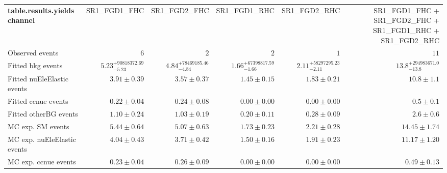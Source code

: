 

\begin{table}
\begin{center}
\setlength{\tabcolsep}{0.0pc}
{\small
\begin{tabular*}{\textwidth}{@{\extracolsep{\fill}}lrrrrr}
\noalign{\smallskip}\hline\noalign{\smallskip}
{\bf table.results.yields channel}           & SR1\_FGD1\_FHC            & SR1\_FGD2\_FHC            & SR1\_FGD1\_RHC            & SR1\_FGD2\_RHC            & SR1\_FGD1\_FHC + SR1\_FGD2\_FHC + SR1\_FGD1\_RHC + SR1\_FGD2\_RHC              \\[-0.05cm]
\noalign{\smallskip}\hline\noalign{\smallskip}
Observed events          & $6$              & $2$              & $2$              & $1$              & $11$                    \\
\noalign{\smallskip}\hline\noalign{\smallskip}
Fitted bkg events         & $5.23_{-5.23}^{+90818372.69}$          & $4.84_{-4.84}^{+78469185.46}$          & $1.66_{-1.66}^{+67398817.59}$          & $2.11_{-2.11}^{+58297295.23}$          & $13.8_{-13.8}^{+294983671.0}$              \\
\noalign{\smallskip}\hline\noalign{\smallskip}
        Fitted nuEleElastic events         & $3.91 \pm 0.39$          & $3.57 \pm 0.37$          & $1.45 \pm 0.15$          & $1.83 \pm 0.21$          & $10.8 \pm 1.1$              \\
        Fitted ccnue events         & $0.22 \pm 0.04$          & $0.24 \pm 0.08$          & $0.00 \pm 0.00$          & $0.00 \pm 0.00$          & $0.5 \pm 0.1$              \\
        Fitted otherBG events         & $1.10 \pm 0.24$          & $1.03 \pm 0.19$          & $0.20 \pm 0.11$          & $0.28 \pm 0.09$          & $2.6 \pm 0.6$              \\
 \noalign{\smallskip}\hline\noalign{\smallskip}
MC exp. SM events              & $5.44 \pm 0.64$          & $5.07 \pm 0.63$          & $1.73 \pm 0.23$          & $2.21 \pm 0.28$          & $14.45 \pm 1.74$              \\
\noalign{\smallskip}\hline\noalign{\smallskip}
        MC exp. nuEleElastic events         & $4.04 \pm 0.43$          & $3.71 \pm 0.42$          & $1.50 \pm 0.16$          & $1.91 \pm 0.23$          & $11.17 \pm 1.20$              \\
        MC exp. ccnue events         & $0.23 \pm 0.04$          & $0.26 \pm 0.09$          & $0.00 \pm 0.00$          & $0.00 \pm 0.00$          & $0.49 \pm 0.13$              \\

\end{tabular*}}
\end{center}
\end{table}
